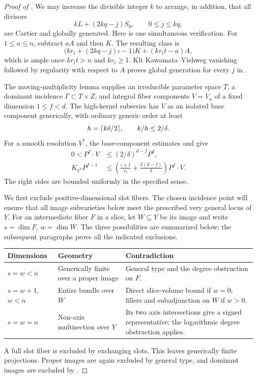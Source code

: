 \begin{proof}[Proof of ]
We may increase the divisible integer \(k\) to arrange, in addition,
that all divisors
\begin{equation}\label{eq:two-slot-fillers}
 kL+(2kq-j)S_0,\qquad 0\le j\le kq ,
\end{equation}
are Cartier and globally generated. Here is one simultaneous
verification. For \(1\le a\le n\), subtract \(aA\) and then \(K\).
The resulting class is
\[
 \bigl(kr_t+(2kq-j)\iota-1\bigr)K+(kr_tt-a)A,
\]
which is ample once \(kr_tt>n\) and \(kr_t\ge1\).
Klt Kawamata--Viehweg vanishing followed by regularity with respect
to \(A\) proves global generation for every \(j\) in
.

The moving-multiplicity lemma supplies an irreducible parameter
space \(T\), a dominant incidence
\(\Gamma\subset T\times Z\), and integral fiber components
\(V=V_u\) of a fixed dimension \(1\le f<d\). The high-kernel
subseries has \(V\) as an isolated base component generically, with
ordinary generic order at least
\[
 h=\lceil k\delta/2\rceil,\qquad k/h\le2/\delta .
\]
For a smooth resolution \(V^*\), the base-component estimates and
 give
\begin{align}
 0<P^f\cdot V
 &\le(2/\delta)^{d-f}P^d,
 \label{eq:two-slot-center-volume}\\
 K_{V^*}P^{f-1}
 &\le
 \left(\frac{\iota+1}{r_t}+\frac{2(d-f)}{\delta}\right)P^f\cdot V .
 \label{eq:two-slot-center-canonical}
\end{align}
The right sides are bounded uniformly in the specified sense.

We first exclude positive-dimensional slot fibers. The chosen incidence
point will ensure that all image subvarieties below meet the prescribed
very general locus of \(Y\). For an intermediate fiber \(F\) in a slice, let \(W\subseteq Y\)
be its image and write \(s=\dim F\), \(w=\dim W\). The three
possibilities are summarized below; the subsequent paragraphs prove
all the indicated exclusions.
\begin{center}
\small
\begin{tabular}{@{}p{}p{}p{}@{}}
\toprule
Dimensions & Geometry & Contradiction \\
\midrule
\(s=w<n\) & Generically finite over a proper image & General type and the degree obstruction on \(F\). \\[3pt]
\(s=w+1\), \(w<n\) & Entire bundle over \(W\) & Direct slice-volume bound if \(w=0\); fillers and subadjunction on \(W\) if \(w>0\). \\[3pt]
\(s=w=n\) & Non-axis multisection over \(Y\) & Its two axis intersections give a signed representative; the logarithmic degree obstruction applies. \\
\bottomrule
\end{tabular}
\end{center}
A full slot fiber is excluded by exchanging slots. This leaves
generically finite projections. Proper images are again excluded by
general type, and dominant images are excluded by
.


\end{proof}
